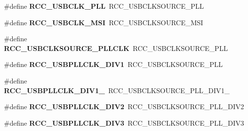 \begin{DoxyCompactItemize}
\item 
\hypertarget{group___h_a_l___r_c_c___aliased_ga422c36ab3f01cba07d36c501bf230363}{\#define {\bfseries R\-C\-C\-\_\-\-U\-S\-B\-C\-L\-K\-\_\-\-P\-L\-L}~R\-C\-C\-\_\-\-U\-S\-B\-C\-L\-K\-S\-O\-U\-R\-C\-E\-\_\-\-P\-L\-L}\label{group___h_a_l___r_c_c___aliased_ga422c36ab3f01cba07d36c501bf230363}

\item 
\hypertarget{group___h_a_l___r_c_c___aliased_gab654f9e79c98d6d8edd733ad9606e98f}{\#define {\bfseries R\-C\-C\-\_\-\-U\-S\-B\-C\-L\-K\-\_\-\-M\-S\-I}~R\-C\-C\-\_\-\-U\-S\-B\-C\-L\-K\-S\-O\-U\-R\-C\-E\-\_\-\-M\-S\-I}\label{group___h_a_l___r_c_c___aliased_gab654f9e79c98d6d8edd733ad9606e98f}

\item 
\hypertarget{group___h_a_l___r_c_c___aliased_ga5e2534f64b47ffdfe41dd2ced073389f}{\#define {\bfseries R\-C\-C\-\_\-\-U\-S\-B\-C\-L\-K\-S\-O\-U\-R\-C\-E\-\_\-\-P\-L\-L\-C\-L\-K}~R\-C\-C\-\_\-\-U\-S\-B\-C\-L\-K\-S\-O\-U\-R\-C\-E\-\_\-\-P\-L\-L}\label{group___h_a_l___r_c_c___aliased_ga5e2534f64b47ffdfe41dd2ced073389f}

\item 
\hypertarget{group___h_a_l___r_c_c___aliased_ga7bc98d6b5187339ea08d38e635b52788}{\#define {\bfseries R\-C\-C\-\_\-\-U\-S\-B\-P\-L\-L\-C\-L\-K\-\_\-\-D\-I\-V1}~R\-C\-C\-\_\-\-U\-S\-B\-C\-L\-K\-S\-O\-U\-R\-C\-E\-\_\-\-P\-L\-L}\label{group___h_a_l___r_c_c___aliased_ga7bc98d6b5187339ea08d38e635b52788}

\item 
\hypertarget{group___h_a_l___r_c_c___aliased_ga5ce8367d15851ff6055cffc9c31ce174}{\#define {\bfseries R\-C\-C\-\_\-\-U\-S\-B\-P\-L\-L\-C\-L\-K\-\_\-\-D\-I\-V1\-\_}~R\-C\-C\-\_\-\-U\-S\-B\-C\-L\-K\-S\-O\-U\-R\-C\-E\-\_\-\-P\-L\-L\-\_\-\-D\-I\-V1\-\_}\label{group___h_a_l___r_c_c___aliased_ga5ce8367d15851ff6055cffc9c31ce174}

\item 
\hypertarget{group___h_a_l___r_c_c___aliased_gabe13349c49b3ef0401d97c2b748ffe7b}{\#define {\bfseries R\-C\-C\-\_\-\-U\-S\-B\-P\-L\-L\-C\-L\-K\-\_\-\-D\-I\-V2}~R\-C\-C\-\_\-\-U\-S\-B\-C\-L\-K\-S\-O\-U\-R\-C\-E\-\_\-\-P\-L\-L\-\_\-\-D\-I\-V2}\label{group___h_a_l___r_c_c___aliased_gabe13349c49b3ef0401d97c2b748ffe7b}

\item 
\hypertarget{group___h_a_l___r_c_c___aliased_ga895e6eac56d6689996989b9417c9ad62}{\#define {\bfseries R\-C\-C\-\_\-\-U\-S\-B\-P\-L\-L\-C\-L\-K\-\_\-\-D\-I\-V3}~R\-C\-C\-\_\-\-U\-S\-B\-C\-L\-K\-S\-O\-U\-R\-C\-E\-\_\-\-P\-L\-L\-\_\-\-D\-I\-V3}\label{group___h_a_l___r_c_c___aliased_ga895e6eac56d6689996989b9417c9ad62}


\end{DoxyCompactItemize}
